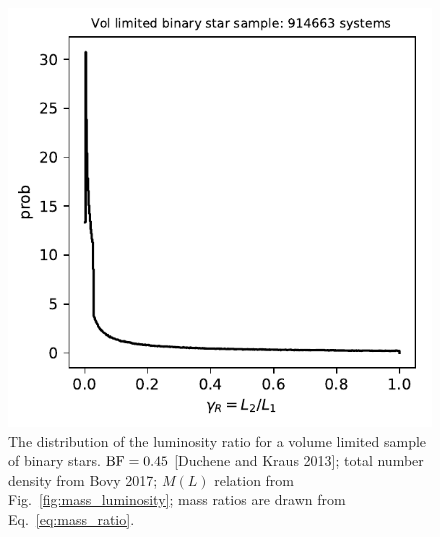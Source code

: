 \documentclass{emulateapj}
\begin{document}
\begin{figure}[!t]
	\begin{center}
		\includegraphics[scale=.8]{figures/gammaR_distribn_vol_limited.pdf}
	\end{center}
	\caption{The distribution of the luminosity ratio for a volume limited 
	sample of binary stars. ${\rm BF} = 0.45$ [Duchene and Kraus 2013]; total 
	number density from Bovy 2017; $M(L)$ relation from 
	Fig.~\ref{fig:mass_luminosity}; mass ratios are drawn from 
	Eq.~\ref{eq:mass_ratio}.}
	\label{fig:gammaR_distribn_vol_limited}
\end{figure}
\end{document}

